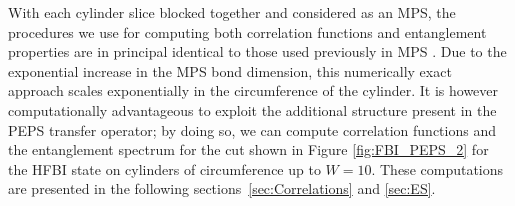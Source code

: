 With each cylinder slice blocked together and considered as an MPS,
the procedures we use for computing both correlation functions and entanglement properties
are in principal identical to those used previously in MPS \cite{cirac2011,pollmann2010}.
Due to the exponential increase in the MPS bond dimension, this numerically exact approach
scales exponentially in the circumference of the cylinder.
It is however computationally advantageous to exploit the additional 
structure present in the PEPS transfer operator; 
by doing so, we can compute correlation functions and
the entanglement spectrum for the cut shown in Figure \ref{fig:FBI_PEPS_2}
for the HFBI state on cylinders of circumference up to $W=10$.
These computations are presented in the following 
sections~\ref{sec:Correlations} and \ref{sec:ES}.